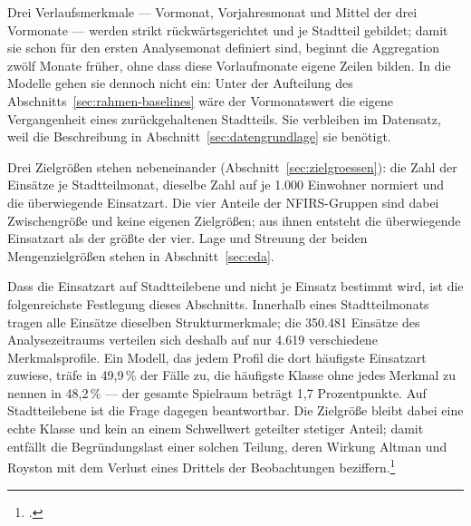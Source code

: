Drei Verlaufsmerkmale --- Vormonat, Vorjahresmonat und Mittel der drei
Vormonate --- werden strikt rückwärtsgerichtet und je Stadtteil gebildet; damit
sie schon für den ersten Analysemonat definiert sind, beginnt die Aggregation
zwölf Monate früher, ohne dass diese Vorlaufmonate eigene Zeilen bilden. In die
Modelle gehen sie dennoch nicht ein: Unter der Aufteilung des
Abschnitts~\ref{sec:rahmen-baselines} wäre der Vormonatswert die eigene
Vergangenheit eines zurückgehaltenen Stadtteils. Sie verbleiben im Datensatz,
weil die Beschreibung in Abschnitt~\ref{sec:datengrundlage} sie benötigt.

Drei Zielgrößen stehen nebeneinander (Abschnitt~\ref{sec:zielgroessen}): die
Zahl der Einsätze je Stadtteilmonat, dieselbe Zahl auf je 1.000 Einwohner
normiert und die überwiegende Einsatzart. Die vier Anteile der NFIRS-Gruppen
sind dabei Zwischengröße und keine eigenen Zielgrößen; aus ihnen entsteht die
überwiegende Einsatzart als der größte der vier. Lage und Streuung der beiden
Mengenzielgrößen stehen in Abschnitt~\ref{sec:eda}.

Dass die Einsatzart auf Stadtteilebene und nicht je Einsatz bestimmt wird, ist
die folgenreichste Festlegung dieses Abschnitts. Innerhalb eines
Stadtteilmonats tragen alle Einsätze dieselben Strukturmerkmale; die 350.481
Einsätze des Analysezeitraums verteilen sich deshalb auf nur 4.619 verschiedene
Merkmalsprofile. Ein Modell, das jedem Profil die dort häufigste Einsatzart
zuwiese, träfe in 49,9\,\% der Fälle zu, die häufigste Klasse ohne jedes
Merkmal zu nennen in 48,2\,\% --- der gesamte Spielraum beträgt 1,7
Prozentpunkte. Auf Stadtteilebene ist die Frage dagegen beantwortbar. Die
Zielgröße bleibt dabei eine echte Klasse und kein an einem Schwellwert
geteilter stetiger Anteil; damit entfällt die Begründungslast einer solchen
Teilung, deren Wirkung Altman und Royston mit dem Verlust eines Drittels der
Beobachtungen beziffern.\footcite{Altman2006}

